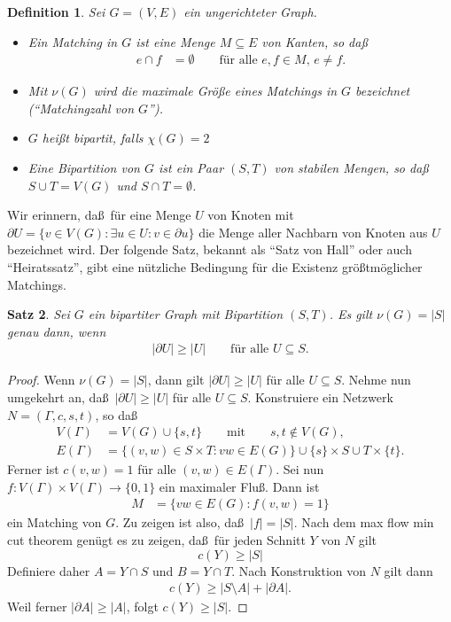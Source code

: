 \documentclass[10pt,reqno]{amsart}
\numberwithin{equation}{section}
\newcommand\alert[1]{\emph{#1}}
\newtheorem{definition}{Definition}[section]
\newtheorem{theorem}[definition]{Satz}
\begin{document}
\begin{definition}\label{def_match}
Sei $G=(V,E)$ ein ungerichteter Graph.
	\begin{itemize}
		\item Ein \alert{Matching} in $G$ ist eine Menge $M\subseteq E$ von Kanten, so da\ss
			\begin{align*}
				e\cap f&=\emptyset\qquad\mbox{f\"ur alle }e,f\in M,\,e\neq f.
			\end{align*}
		\item Mit $\nu(G)$ wird die maximale Gr\"o\ss e eines Matchings in $G$ bezeichnet (``Matchingzahl von $G$'').
		\item $G$ hei\ss t \alert{bipartit}, falls $\chi(G)=2$
		\item Eine \alert{Bipartition} von $G$ ist ein Paar $(S,T)$ von stabilen Mengen, so da\ss\ $S\cup T=V(G)$ und $S\cap T=\emptyset$.
	\end{itemize}
\end{definition}

	Wir erinnern, da\ss\ f\"ur eine Menge $U$ von Knoten mit $\partial U=\{v\in V(G):\exists u\in U:v\in\partial u\}$ die Menge aller Nachbarn von Knoten aus $U$ bezeichnet wird.
	Der folgende Satz, bekannt als ``Satz von Hall'' oder auch ``Heiratssatz'', gibt eine n\"utzliche Bedingung f\"ur die Existenz gr\"o\ss tm\"oglicher Matchings.

\begin{theorem}\label{thm_hall}
	Sei $G$ ein bipartiter Graph mit Bipartition $(S,T)$.
	Es gilt $\nu(G)=|S|$ genau dann, wenn
	\begin{align*}
		|\partial U|\geq|U|\qquad\mbox{f\"ur alle }U\subseteq S.
	\end{align*}
\end{theorem}
\begin{proof}
	Wenn $\nu(G)=|S|$, dann gilt $|\partial U|\geq|U|$ f\"ur alle $U\subseteq S$.
	Nehme nun umgekehrt an, da\ss\ $|\partial U|\geq|U|$ f\"ur alle $U\subseteq S$.
	Konstruiere ein Netzwerk $N=(\Gamma,c,s,t)$, so da\ss\
	\begin{align*}
		V(\Gamma)&=V(G)\cup\{s,t\}\qquad\mbox{mit}\qquad s,t\not\in V(G),\\
		E(\Gamma)&=\{(v,w)\in S\times T:vw\in E(G)\}\cup\{s\}\times S\cup T\times\{t\}.
	\end{align*}
	Ferner ist $c(v,w)=1$ f\"ur alle $(v,w)\in E(\Gamma)$.
	Sei nun $f:V(\Gamma)\times V(\Gamma)\to\{0,1\}$ ein maximaler Flu\ss.
	Dann ist
	\begin{align*}
		M&=\{vw\in E(G):f(v,w)=1\}
	\end{align*}
	ein Matching von $G$.
	Zu zeigen ist also, da\ss\ $|f|=|S|$.
	Nach dem max flow min cut theorem gen\"ugt es zu zeigen, da\ss\ f\"ur jeden Schnitt $Y$ von $N$ gilt
		$$c(Y)\geq|S|$$
	Definiere daher $A=Y\cap S$ und $B=Y\cap T$.
	Nach Konstruktion von $N$ gilt dann
	\begin{align*}
		c(Y)\geq|S\setminus A|+|\partial A|.
	\end{align*}
	Weil ferner $|\partial A|\geq|A|$, folgt $c(Y)\geq|S|$.
\end{proof}
\end{document}
